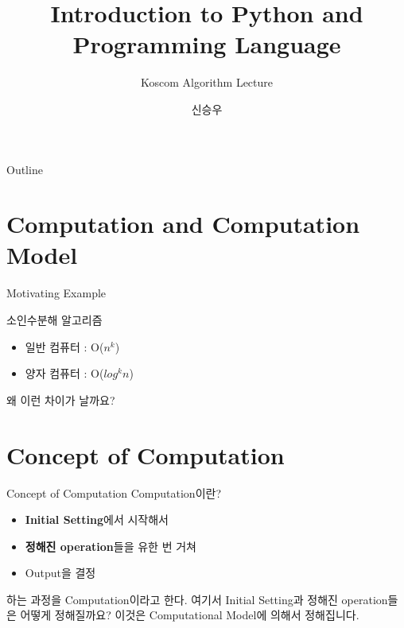 \documentclass{beamer}
\title{Introduction to Python and Programming Language}
\subtitle{Koscom Algorithm Lecture}
\author{신승우}
\begin{document}
\begin{frame}
  \titlepage
\end{frame}

\begin{frame}{Outline}
  \tableofcontents
\end{frame}



\section{Computation and Computation Model} 


\begin{frame}{Motivating Example} 

소인수분해 알고리즘 
\begin{itemize} 
\item 일반 컴퓨터 : O($n^k$)
\item 양자 컴퓨터 : O($log^k n$)
\end{itemize}

왜 이런 차이가 날까요?
\end{frame}

\section{Concept of Computation}

\begin{frame}{Concept of Computation}
Computation이란? 

\begin{itemize} 
\item \textbf{Initial Setting}에서 시작해서 
\item \textbf{정해진 operation}들을 유한 번 거쳐 
\item Output을 결정
\end{itemize}

하는 과정을 Computation이라고 한다. 여기서 Initial Setting과 정해진 operation들은 어떻게 정해질까요? 이것은 Computational Model에 의해서 정해집니다. 
\end{frame}
\end{document}
